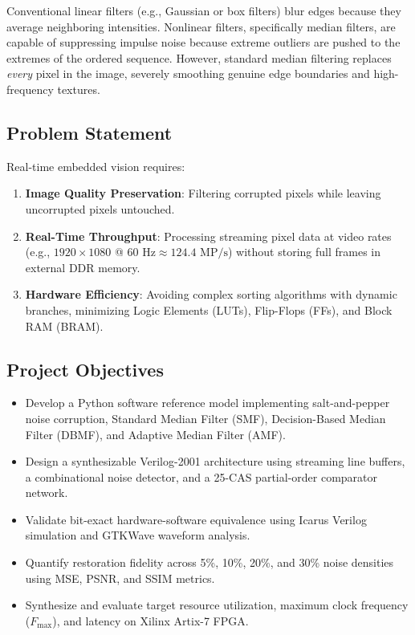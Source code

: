 \documentclass[12pt,a4paper]{article}
\begin{document}
Conventional linear filters (e.g., Gaussian or box filters) blur edges because they average neighboring intensities. Nonlinear filters, specifically median filters, are capable of suppressing impulse noise because extreme outliers are pushed to the extremes of the ordered sequence. However, standard median filtering replaces \textit{every} pixel in the image, severely smoothing genuine edge boundaries and high-frequency textures.

\subsection{Problem Statement}
Real-time embedded vision requires:
\begin{enumerate}
    \item \textbf{Image Quality Preservation}: Filtering corrupted pixels while leaving uncorrupted pixels untouched.
    \item \textbf{Real-Time Throughput}: Processing streaming pixel data at video rates (e.g., $1920\times 1080$ @ $60\text{ Hz} \approx 124.4\text{ MP/s}$) without storing full frames in external DDR memory.
    \item \textbf{Hardware Efficiency}: Avoiding complex sorting algorithms with dynamic branches, minimizing Logic Elements (LUTs), Flip-Flops (FFs), and Block RAM (BRAM).
\end{enumerate}

\subsection{Project Objectives}
\begin{itemize}
    \item Develop a Python software reference model implementing salt-and-pepper noise corruption, Standard Median Filter (SMF), Decision-Based Median Filter (DBMF), and Adaptive Median Filter (AMF).
    \item Design a synthesizable Verilog-2001 architecture using streaming line buffers, a combinational noise detector, and a 25-CAS partial-order comparator network.
    \item Validate bit-exact hardware-software equivalence using Icarus Verilog simulation and GTKWave waveform analysis.
    \item Quantify restoration fidelity across 5\%, 10\%, 20\%, and 30\% noise densities using MSE, PSNR, and SSIM metrics.
    \item Synthesize and evaluate target resource utilization, maximum clock frequency ($F_{\max}$), and latency on Xilinx Artix-7 FPGA.
\end{itemize}
\end{document}
